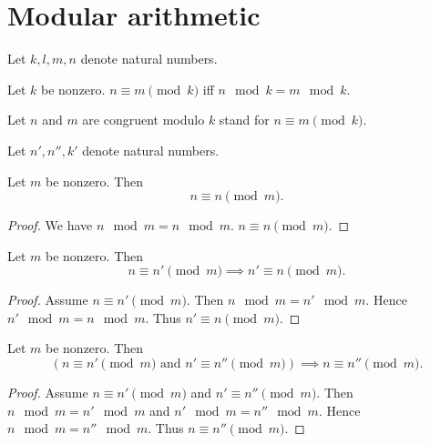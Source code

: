 \documentclass[../../natural-numbers.ftl.tex]{subfiles}
\begin{document}
  \section{Modular arithmetic}

  \begin{forthel}
  \end{forthel}

  \begin{forthel}
    Let $k, l, m, n$ denote natural numbers.
  \end{forthel}


  \begin{forthel}
    \begin{definition}
      Let $k$ be nonzero.
      $n \equiv m \pmod{k}$ iff $n \mod k = m \mod k$.
    \end{definition}

    Let $n$ and $m$ are congruent modulo $k$ stand for $n \equiv m \pmod{k}$.

    Let $n',n'',k'$ denote natural numbers.

    \begin{proposition}[NN 03 03 188421]
      Let $m$ be nonzero.
      Then \[ n \equiv n \pmod{m}. \]
    \end{proposition}
    \begin{proof}
      We have $n \mod m = n \mod m$.
      $n \equiv n \pmod{m}$.
    \end{proof}

    \begin{proposition}[NN 03 03 880545]
      Let $m$ be nonzero.
      Then \[ n \equiv n' \pmod{m} \implies n' \equiv n \pmod{m}. \]
    \end{proposition}
    \begin{proof}
      Assume $n \equiv n' \pmod{m}$.
      Then $n \mod m = n' \mod m$.
      Hence $n' \mod m = n \mod m$.
      Thus $n' \equiv n \pmod{m}$.
    \end{proof}

    \begin{proposition}[NN 03 03 310316]
      Let $m$ be nonzero.
      Then \[ (\text{$n \equiv n' \pmod{m}$ and $n' \equiv n'' \pmod{m}$}) \implies n \equiv n'' \pmod{m}. \]
    \end{proposition}
    \begin{proof}
      Assume $n \equiv n' \pmod{m}$ and $n' \equiv n'' \pmod{m}$.
      Then $n \mod m = n' \mod m$ and $n' \mod m = n'' \mod m$.
      Hence $n \mod m = n'' \mod m$.
      Thus $n \equiv n'' \pmod{m}$.
    \end{proof}


\end{forthel}
\end{document}
